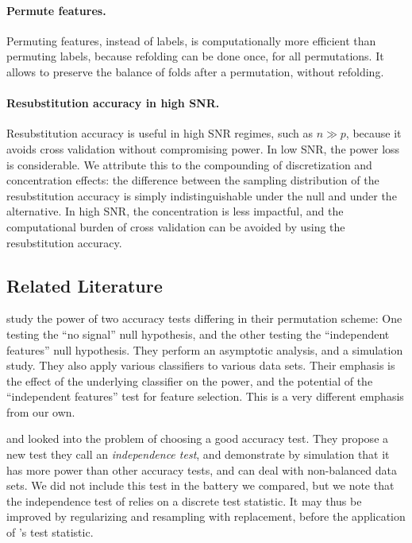 \documentclass[12pt,a4paper]{article}
\begin{document}
\paragraph{Permute features.} 
Permuting features, instead of labels, is computationally more efficient than permuting labels, because refolding can be done once, for all permutations.
It allows to preserve the balance of folds after a permutation, without refolding.

\paragraph{Resubstitution accuracy in high SNR.} 
Resubstitution accuracy is useful in high SNR regimes, such as $n \gg p$, because it avoids cross validation without compromising power. 
In low SNR, the power loss is considerable. 
We attribute this to the compounding of discretization and concentration effects: the difference between the sampling distribution of the resubstitution accuracy is simply indistinguishable under the null and under the alternative. 
In high SNR, the concentration is less impactful, and the computational burden of cross validation can be avoided by using the resubstitution accuracy. \newline
 


\subsection{Related Literature}
\cite{ojala_permutation_2010} study the power of two accuracy tests differing in their permutation scheme:
One testing the ``no signal'' null hypothesis, and the other testing the ``independent features'' null hypothesis. 
They perform an asymptotic analysis, and a simulation study. 
They also apply various classifiers to various data sets. 
Their emphasis is the effect of the underlying classifier on the power, and the potential of the ``independent features'' test for feature selection.
This is a very different emphasis from our own.


\cite{olivetti_induction_2012} and \cite{olivetti_statistical_2014} looked into the problem of choosing a good accuracy test. 
They propose a new test they call an \emph{independence test}, and demonstrate by simulation that it has more power than other accuracy tests, and can deal with non-balanced data sets. 
We did not include this test in the battery we compared, but we note that the independence test of \cite{olivetti_induction_2012} relies on a discrete test statistic. 
It may thus be improved by regularizing and resampling with replacement, before the application of \cite{olivetti_induction_2012}'s test statistic. 
\end{document}
